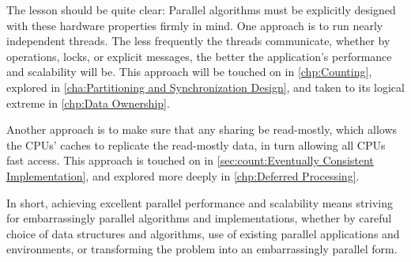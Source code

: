 The lesson should be quite clear:
Parallel algorithms must be explicitly designed with these hardware
properties firmly in mind.
One approach is to run nearly independent threads.
The less frequently the threads communicate, whether by  operations,
locks, or explicit messages, the better the application's performance
and scalability will be.
This approach will be touched on in \cref{chp:Counting},
explored in \cref{cha:Partitioning and Synchronization Design},
and taken to its logical extreme in \cref{chp:Data Ownership}.

Another approach is to make sure that any sharing be read-mostly, which
allows the CPUs' caches to replicate the read-mostly data, in turn
allowing all CPUs fast access.
This approach is touched on in
\cref{sec:count:Eventually Consistent Implementation},
and explored more deeply in \cref{chp:Deferred Processing}.

In short, achieving excellent parallel performance and scalability means
striving for embarrassingly parallel algorithms and implementations,
whether by careful choice of data structures and algorithms, use of
existing parallel applications and environments, or transforming the
problem into an embarrassingly parallel form.

\QuickQuizEnd
